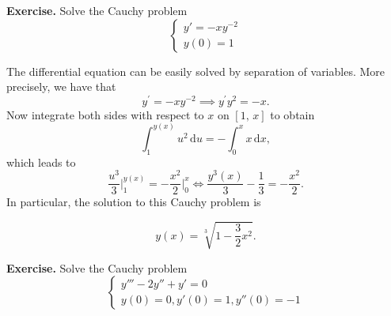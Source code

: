 \documentclass[a4paper,10 pt]{report}
\newcommand{\finalanswer}[1]{%
    \begin{finalAnswer}
    \[
        #1
    \]
    \end{finalAnswer}
}
\theoremstyle{definition}
\begin{document}
\begin{exerciseBox} \textbf{Exercise.}  Solve the Cauchy problem
\[
\begin{cases} y' = - x y^{-2}\\ y(0) = 1\end{cases}\]
 \end{exerciseBox}

\begin{solutionBox} The differential equation can be easily solved by separation of variables. More precisely, we have that
\begin{equation*}y^\prime = - x y^{-2} \implies y^\prime y^2 = -x. \end{equation*}
Now integrate both sides with respect to $x$ on $[1, \, x]$ to obtain
\begin{equation*}\int_1^{y(x)} u^2 \, \mathrm{d}u = - \int_0^x x \, \mathrm{d}x, \end{equation*}
which leads to
\begin{equation*}\frac{u^3}{3} \big|_{1}^{y(x)} = -\frac{x^2}{2} \big|_{0}^{x} \iff \frac{y^3(x)}{3} - \frac{1}{3} = - \frac{x^2}{2}.\end{equation*}
In particular, the solution to this Cauchy problem is
\finalanswer{
y(x) = \sqrt[3]{1 - \frac{3}{2}x^2}.
}
\end{solutionBox}

\begin{exerciseBox} \textbf{Exercise.}  Solve the Cauchy problem
\[
\begin{cases}
y''' - 2y'' + y' = 0 \\ y(0)=0, y'(0)=1, y''(0)=-1	
\end{cases}
\] \end{exerciseBox}
\end{document}
